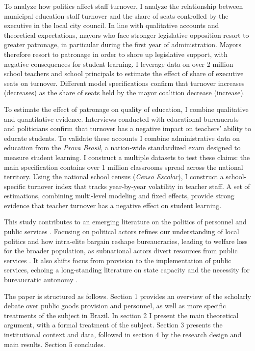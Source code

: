 \documentclass[12pt,a4paper]{article}
\begin{document}
To analyze how politics affect staff turnover, I analyze the relationship between municipal education staff turnover and the share of seats controlled by the executive in the local city council. In line with qualitative accounts and theoretical expectations, mayors who face stronger legislative opposition resort to greater patronage, in particular during the first year of administration. Mayors therefore resort to patronage in order to shore up legislative support, with negative consequences for student learning. I leverage data on over 2 million school teachers and school principals to estimate the effect of share of executive seats on turnover. Different model specifications confirm that turnover increases (decreases) as the share of seats held by the mayor coalition decrease (increase).

To estimate the effect of patronage on quality of education, I combine qualitative and quantitative evidence. Interviews conducted with educational bureaucrats and politicians confirm that turnover has a negative impact on teachers' ability to educate students. To validate these accounts I combine administrative data on education from the \emph{Prova Brasil}, a nation-wide standardized exam designed to measure student learning. I construct a multiple datasets to test these claims: the main specification contains over 1 million classrooms spread across the national territory. Using the national school census (\emph{Censo Escolar}), I construct a school-specific turnover index that tracks year-by-year volatility in teacher staff. A set of estimations, combining multi-level modeling and fixed effects, provide strong evidence that teacher turnover has a negative effect on student learning.

This study contributes to an emerging literature on the politics of personnel and public services \citep{pepinsky_bureaucracy_2017, finan_personnel_2015, gulzar_politicians_2017}. Focusing on political actors refines our understanding of local politics and how intra-elite bargain reshape bureaucracies, leading to welfare loss for the broader population, as subnational actors divert resources from public services \citep{ferraz_corrupting_2012}. It also shifts focus from provision to the implementation of public services, echoing a long-standing literature on state capacity and the necessity for bureaucratic autonomy \citep{kohli_state-directed_2004, evans_embedded_1995}.

The paper is structured as follows. Section 1 provides an overview of the scholarly debate over public goods provision and personnel, as well as more specific treatments of the subject in Brazil. In section 2 I present the main theoretical argument, with a formal treatment of the subject. Section 3 presents the institutional context and data, followed in section 4 by the research design and main results. Section 5 concludes.
\end{document}
